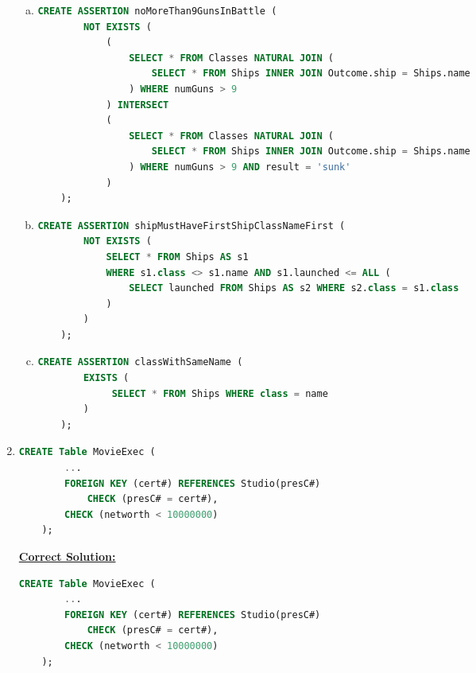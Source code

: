 \documentclass[12pt]{article}
\begin{document}
\begin{enumerate}[1.]
\begin{enumerate}[a)]
        \item

    \begin{lstlisting}[language=SQL]
    CREATE ASSERTION noMoreThan9GunsInBattle (
        NOT EXISTS (
            (
                SELECT * FROM Classes NATURAL JOIN (
                    SELECT * FROM Ships INNER JOIN Outcome.ship = Ships.name
                ) WHERE numGuns > 9
            ) INTERSECT
            (
                SELECT * FROM Classes NATURAL JOIN (
                    SELECT * FROM Ships INNER JOIN Outcome.ship = Ships.name
                ) WHERE numGuns > 9 AND result = 'sunk'
            )
    );
    \end{lstlisting}

        \item

    \begin{lstlisting}[language=SQL]
    CREATE ASSERTION shipMustHaveFirstShipClassNameFirst (
        NOT EXISTS (
            SELECT * FROM Ships AS s1
            WHERE s1.class <> s1.name AND s1.launched <= ALL (
                SELECT launched FROM Ships AS s2 WHERE s2.class = s1.class
            )
        )
    );
    \end{lstlisting}

        \item

    \begin{lstlisting}[language=SQL]
    CREATE ASSERTION classWithSameName (
        EXISTS (
             SELECT * FROM Ships WHERE class = name
        )
    );
    \end{lstlisting}

    \end{enumerate}

    \item


    \begin{lstlisting}[language=SQL]
    CREATE Table MovieExec (
        ...
        FOREIGN KEY (cert#) REFERENCES Studio(presC#)
            CHECK (presC# = cert#),
        CHECK (networth < 10000000)
    );
    \end{lstlisting}

    \begin{mdframed}
        \underline{\textbf{Correct Solution:}}

        \bigskip

    \begin{lstlisting}[language=SQL]
    CREATE Table MovieExec (
        ...
        FOREIGN KEY (cert#) REFERENCES Studio(presC#)
            CHECK (presC# = cert#),
        CHECK (networth < 10000000)
    );
    \end{lstlisting}


\end{mdframed}
\end{enumerate}
\end{document}
